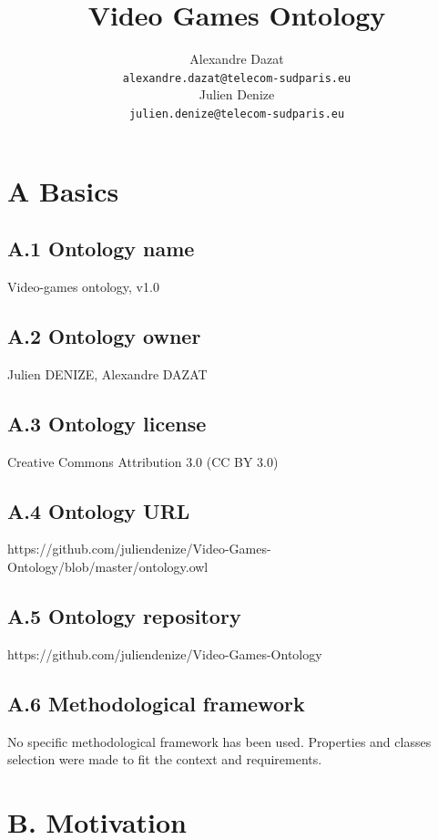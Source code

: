 \documentclass{article}
\title{Video Games Ontology}
\author{
  Alexandre Dazat \\
  \texttt{alexandre.dazat@telecom-sudparis.eu} \\
   \And
  Julien Denize\\
  \texttt{julien.denize@telecom-sudparis.eu} \\
}
\begin{document}
\maketitle




\section*{A Basics}

\subsection*{A.1 Ontology name}
Video-games ontology, v1.0 

\subsection*{A.2 Ontology owner}

Julien DENIZE, Alexandre DAZAT

\subsection*{A.3 Ontology license}

Creative Commons Attribution 3.0 (CC BY 3.0) 

\subsection*{A.4 Ontology URL}

https://github.com/juliendenize/Video-Games-Ontology/blob/master/ontology.owl


\subsection*{A.5 Ontology repository }

https://github.com/juliendenize/Video-Games-Ontology

\subsection*{A.6 Methodological framework}

No specific methodological framework has been used. Properties and classes selection were made to fit the context and requirements. 


\section*{B. Motivation}
\end{document}
